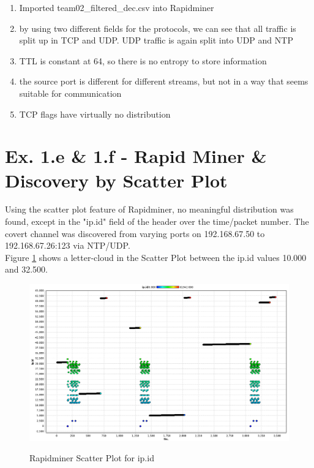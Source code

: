 \documentclass{article}
\begin{document}
\begin{enumerate}
	\item Imported team02\_filtered\_dec.csv into Rapidminer
	\item by using two different fields for the protocols, we can see that all traffic is split up in TCP and UDP. UDP traffic is again split into UDP and NTP
	\item TTL is constant at 64, so there is no entropy to store information
	\item the source port is different for different streams, but not in a way that seems suitable for communication
	\item TCP flags have virtually no distribution
\end{enumerate} 

\section*{Ex. 1.e \& 1.f - Rapid Miner \& Discovery by Scatter Plot}
Using the scatter plot feature of Rapidminer, no meaningful distribution was found, except in the "ip.id" field of the header over the time/packet number. The covert channel was discovered from varying ports on 192.168.67.50 to 192.168.67.26:123 via NTP/UDP.\\

Figure \ref{fig:RMscreen} shows a letter-cloud in the Scatter Plot between the ip.id values 10.000 and 32.500.
\begin{figure}[H] 
	\centering %
	{\includegraphics[width=\textwidth]{images/RMscreen.png}} %
	\caption{Rapidminer Scatter Plot for ip.id} 
	\label{fig:RMscreen} %
\end{figure} 
\end{document}
